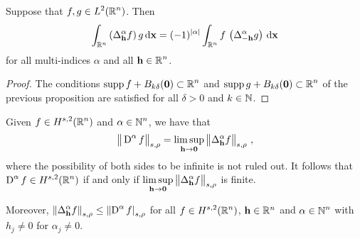 \begin{cor}
Suppose that $\displaystyle f,g \in L^2(\mathbb{R}^n)$.  Then
\[
\int_{\mathbb{R}^n} \left(\Delta^\alpha_{\mathbf{h}} f\right) g \,\mathrm{d}{\mathbf{x}}
= (-1)^{|\alpha|}   
\int_{\mathbb{R}^n} f\,\left(\Delta^\alpha_{-\mathbf{h}} g\right) \,\mathrm{d}{\mathbf{x}}
\]
for all multi-indices $\alpha$ and all $\displaystyle \mathbf{h} \in \mathbb{R}^n$.
\end{cor}

\begin{proof}
The conditions $\displaystyle \operatorname{supp} f + B_{k\delta}(\mathbf{0}) \subset \mathbb{R}^n$ and
$\displaystyle \operatorname{supp} g + B_{k\delta}(\mathbf{0}) \subset \mathbb{R}^n$ of the previous
proposition are satisfied for all $\delta>0$ and $k \in \mathbb{N}$.
\end{proof}

\begin{prop} \label{ell_reg_prop3}
Given $\displaystyle f\in H^{s,2}(\mathbb{R}^n)$ and
$\displaystyle \alpha \in \mathbb{N}^n$, we have that
\begin{equation} \label{ellRegProp3Eq1}
\big\|\operatorname{D}^\alpha f\big\|_{s,\rho} = \limsup_{\mathbf{h}\rightarrow \mathbf{0}}
\big\|\Delta^\alpha_{\mathbf{h}} f\big\|_{s,\rho} \ ,
\end{equation}
where the possibility of both sides to be infinite is not ruled out.
It follows that $\displaystyle \operatorname{D}^\alpha f \in H^{s,2}(\mathbb{R}^n)$ if and only if
$\displaystyle \limsup_{\mathbf{h}\rightarrow \mathbf{0}}
\big\|\Delta^\alpha_{\mathbf{h}} f\big\|_{s,\rho}$ is finite.

Moreover, $\displaystyle \left\| \Delta^\alpha_{\mathbf{h}} f  \right\|_{s,\rho}
\leq \left\| \operatorname{D}^\alpha f\right|_{s,\rho}$ for all
$\displaystyle f\in H^{s,2}(\mathbb{R}^n)$, $\mathbf{h} \in \mathbb{R}^n$ and
$\displaystyle \alpha \in \mathbb{N}^n$ with $h_j \neq 0$ for $\alpha_j \neq 0$.
\end{prop}

